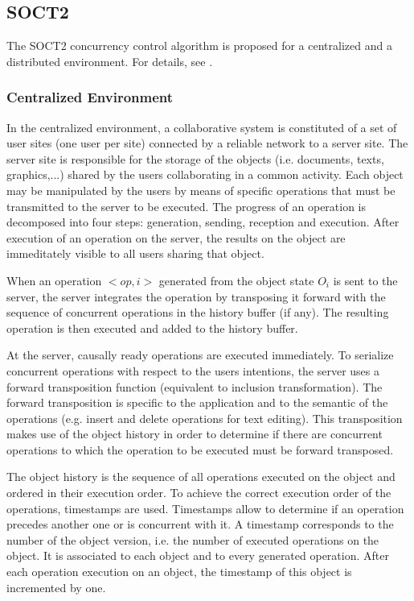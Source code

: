 \subsection{SOCT2}
\label{algo:soct2}

The SOCT2 concurrency control algorithm is proposed for a centralized and a distributed environment. For details, see \cite{suleiman97} \cite{suleiman98}.

\subsubsection{Centralized Environment}
In the centralized environment, a collaborative system is constituted of a set of user sites (one user per site) connected by a reliable network to a server site. The server site is responsible for the storage of the objects (i.e. documents, texts, graphics,...) shared by the users collaborating in a common activity. Each object may be manipulated by the users by means of specific operations that must be transmitted to the server to be executed. The progress of an operation is decomposed into four steps: generation, sending, reception and execution. After execution of an operation on the server, the results on the object are immeditately visible to all users sharing that object.

When an operation $<op,i>$ generated from the object state $O_{i}$ is sent to the server, the server integrates the operation by transposing it forward with the sequence of concurrent operations in the history buffer (if any). The resulting operation is then executed and added to the history buffer.

At the server, causally ready operations are executed immediately. To serialize concurrent operations with respect to the users intentions, the server uses a forward transposition function (equivalent to inclusion transformation). The forward transposition is specific to the application and to the semantic of the operations (e.g. insert and delete operations for text editing). This transposition makes use of the object history in order to determine if there are concurrent operations to which the operation to be executed must be forward transposed.

The object history is the sequence of all operations executed on the object and ordered in their execution order. To achieve the correct execution order of the operations, timestamps are used. Timestamps allow to determine if an operation precedes another one or is concurrent with it. A timestamp corresponds to the number of the object version, i.e. the number of executed operations on the object. It is associated to each object and to every generated operation. After each operation execution on an object, the timestamp of this object is incremented by one.  

